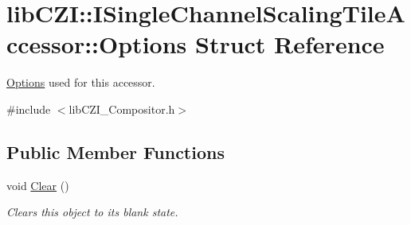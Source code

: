 \hypertarget{structlib_c_z_i_1_1_i_single_channel_scaling_tile_accessor_1_1_options}{}\section{lib\+C\+ZI\+:\+:I\+Single\+Channel\+Scaling\+Tile\+Accessor\+:\+:Options Struct Reference}
\label{structlib_c_z_i_1_1_i_single_channel_scaling_tile_accessor_1_1_options}


\hyperlink{structlib_c_z_i_1_1_i_single_channel_scaling_tile_accessor_1_1_options}{Options} used for this accessor.  




{\ttfamily \#include $<$lib\+C\+Z\+I\+\_\+\+Compositor.\+h$>$}

\subsection*{Public Member Functions}
\begin{DoxyCompactItemize}
\item 
\mbox{\label{structlib_c_z_i_1_1_i_single_channel_scaling_tile_accessor_1_1_options_a62bce09e0eb8da84c26106b183c6d338}} 
void \hyperlink{structlib_c_z_i_1_1_i_single_channel_scaling_tile_accessor_1_1_options_a62bce09e0eb8da84c26106b183c6d338}{Clear} ()
\begin{DoxyCompactList}\small\item\em Clears this object to its blank state. \end{DoxyCompactList}\end{DoxyCompactItemize}

